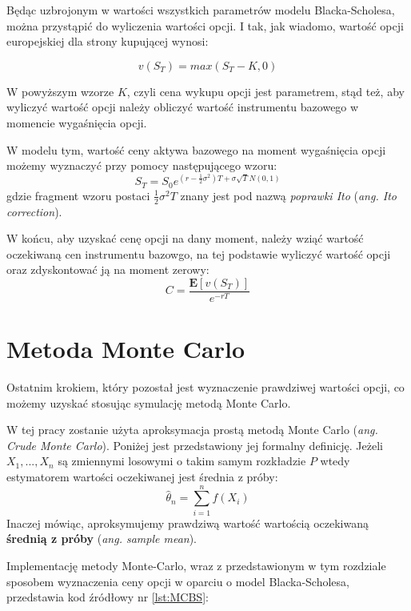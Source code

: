 \documentclass{pracamgr}
\begin{document}
Będąc uzbrojonym w wartości wszystkich parametrów modelu Blacka-Scholesa, można przystąpić
do wyliczenia wartości opcji. I tak, jak wiadomo, wartość opcji europejskiej dla strony kupującej 
wynosi:

\begin{equation}
  v(S_T) = max(S_T-K, 0)
\end{equation}

W powyższym wzorze $K$, czyli cena wykupu opcji jest parametrem, stąd też,  aby wyliczyć wartość opcji należy obliczyć wartość instrumentu bazowego w momencie wygaśnięcia opcji.

W modelu tym, wartość ceny aktywa bazowego na moment wygaśnięcia opcji możemy wyznaczyć przy pomocy następującego wzoru:
\begin{equation}
  S_T = S_0 e^{(r - \frac{1}{2} \sigma^2)T+\sigma \sqrt{T} N(0,1)}
\end{equation}
gdzie fragment wzoru postaci $\frac{1}{2} \sigma^2 T$ znany jest pod nazwą \textit{poprawki Ito} (\textit{ang. Ito correction}).

W końcu, aby uzyskać cenę opcji na dany moment, należy wziąć wartość oczekiwaną cen instrumentu bazowgo, na tej podstawie wyliczyć wartość opcji oraz zdyskontować ją na moment zerowy:
\begin{equation}
  C = \frac{\mathbf{E}[v(S_T)]}{e^{-rT}}
\end{equation}

\section{Metoda Monte Carlo}

Ostatnim krokiem, który pozostał jest wyznaczenie prawdziwej wartości opcji, co możemy uzyskać 
stosując symulację metodą Monte Carlo.

W tej pracy zostanie użyta aproksymacja prostą metodą Monte Carlo (\textit{ang. Crude Monte Carlo}). 
Poniżej jest przedstawiony jej formalny definicję.
Jeżeli $X_1, ..., X_n$ są zmiennymi losowymi o takim samym rozkładzie $P$ wtedy estymatorem wartości
oczekiwanej jest średnia z próby:
\begin{equation}
  \hat{\theta}_n = \sum_{i=1}^n f(X_i) 
\end{equation}
Inaczej mówiąc, aproksymujemy prawdziwą wartość wartością oczekiwaną \textbf{średnią z próby} (\textit{ang. sample mean}).

Implementację metody Monte-Carlo, wraz z przedstawionym w tym rozdziale sposobem wyznaczenia 
ceny opcji w oparciu o model Blacka-Scholesa, przedstawia kod źródłowy nr \ref{lst:MCBS}:
\end{document}

